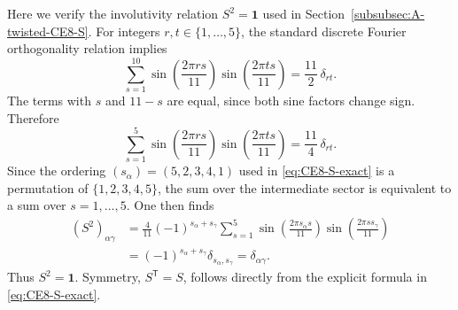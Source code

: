 \documentclass[11pt,a4paper]{article}
\numberwithin{equation}{section}
\begin{document}
Here we verify the involutivity relation $S^2=\mathbf 1$ used in Section~\ref{subsubsec:A-twisted-CE8-S}.  For integers $r,t\in\{1,\ldots,5\}$, the standard discrete Fourier orthogonality relation implies
\begin{equation}
  \sum_{s=1}^{10}
  \sin\!\left(\frac{2\pi r s}{11}\right)
  \sin\!\left(\frac{2\pi t s}{11}\right)
  =\frac{11}{2}\,\delta_{rt}.
  \label{eq:full-sine-orthogonality}
\end{equation}
The terms with $s$ and $11-s$ are equal, since both sine factors change sign.  Therefore
\begin{equation}
  \sum_{s=1}^{5}
  \sin\!\left(\frac{2\pi r s}{11}\right)
  \sin\!\left(\frac{2\pi t s}{11}\right)
  =\frac{11}{4}\,\delta_{rt}.
  \label{eq:half-sine-orthogonality}
\end{equation}
Since the ordering $(s_\alpha)=(5,2,3,4,1)$ used in \eqref{eq:CE8-S-exact} is a permutation of $\{1,2,3,4,5\}$, the sum over the intermediate sector is equivalent to a sum over $s=1,\ldots,5$.  One then finds
\begin{align}
  (S^2)_{\alpha\gamma}
  &=\frac{4}{11}(-1)^{s_\alpha+s_\gamma}
  \sum_{s=1}^{5}
  \sin\!\left(\frac{2\pi s_\alpha s}{11}\right)
  \sin\!\left(\frac{2\pi s s_\gamma}{11}\right)
  \nonumber\\
  &=(-1)^{s_\alpha+s_\gamma}
  \delta_{s_\alpha,s_\gamma}
  =\delta_{\alpha\gamma}.
  \label{eq:S-square-appendix}
\end{align}
Thus $S^2=\mathbf 1$.  Symmetry, $S^{\mathsf T}=S$, follows directly from the explicit formula in \eqref{eq:CE8-S-exact}.
\end{document}
